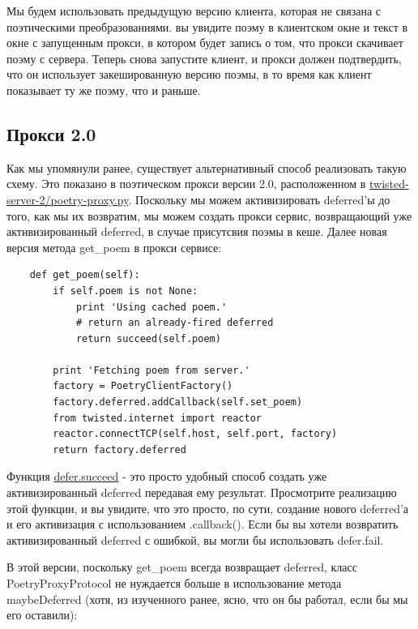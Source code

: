 Мы будем использовать предыдущую версию клиента, 
которая не связана с поэтическими преобразованиями. вы 
увидите поэму в клиентском окне и текст в окне с 
запущенным прокси, в котором будет 
запись о том, что прокси скачивает поэму с сервера. Теперь снова 
запустите клиент, и прокси должен подтвердить, что он использует 
закешированную версию поэмы, в то время как клиент показывает 
ту же поэму, что и раньше. 


\subsection{Прокси 2.0}


Как мы упомянули ранее, существует альтернативный способ 
реализовать такую схему. Это показано в поэтическом прокси 
версии 2.0, расположенном в 
\href{http://github.com/jdavisp3/twisted-intro/blob/master/twisted-server-2/poetry-proxy.py#L1}{twisted-server-2/poetry-proxy.py}. Поскольку мы можем 
активизировать deferred'ы до того, как мы их 
возвратим, мы можем создать прокси сервис, возвращающий 
уже активизированный deferred, в случае присутсвия поэмы в 
кеше. Далее новая версия метода get\_poem в прокси сервисе:

\begin{scriptsize}\begin{verbatim}
    def get_poem(self):
        if self.poem is not None:
            print 'Using cached poem.'
            # return an already-fired deferred
            return succeed(self.poem)

        print 'Fetching poem from server.'
        factory = PoetryClientFactory()
        factory.deferred.addCallback(self.set_poem)
        from twisted.internet import reactor
        reactor.connectTCP(self.host, self.port, factory)
        return factory.deferred
\end{verbatim}\end{scriptsize}


Функция \href{http://twistedmatrix.com/trac/browser/tags/releases/twisted-8.2.0/twisted/internet/defer.py#L30}{defer.succeed} - это просто удобный способ создать уже 
активизированный deferred передавая ему результат. 
Просмотрите реализацию этой функции, и вы увидите, что 
это просто, по сути, создание нового deferred'а и его 
активизация с использованием .callback(). Если бы вы хотели 
возвратить активизированный deferred с ошибкой, вы могли бы 
использовать defer.fail.


В этой версии, поскольку get\_poem всегда возвращает 
deferred, класс PoetryProxyProtocol не нуждается больше 
в использование метода maybeDeferred (хотя, из изученного ранее, 
ясно, что он бы работал, если бы мы его оставили): 

